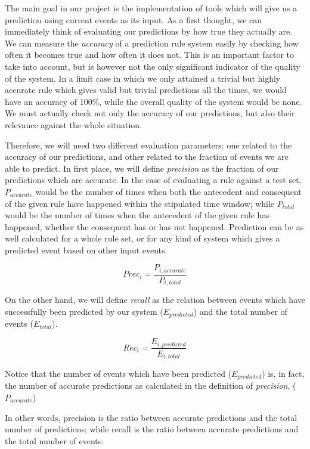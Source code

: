 \documentclass[a4paper,12pt]{article}
\begin{document}
The main goal in our project is the implementation of tools which will give us a prediction using current events as its input. As a first thought, we can immediately think of evaluating our predictions by how true they actually are. We can measure the \emph{accuracy} of a prediction rule system easily by checking how often it becomes true and how often it does not. This is an important factor to take into account, but is however not the only significant indicator of the quality of the system. In a limit case in which we only attained a trivial but highly accurate rule which gives valid but trivial predictions all the times, we would have an accuracy of 100\%, while the overall quality of the system would be none. We must actually check not only the accuracy of our predictions, but also their relevance against the whole situation.

Therefore, we will need two different evaluation parameters: one related to the accuracy of our predictions, and other related to the fraction of events we are able to predict\cite{torgo2003data}. In first place, we will define \emph{precision} as the fraction of our predictions which are accurate. In the case of evaluating a rule against a test set, $P_{accurate}$ would be the number of times when both the antecedent and consequent of the given rule have happened within the stipulated time window; while $P_{total}$ would be the number of times when the antecedent of the given rule has happened, whether the consequent has or has not happened. Prediction can be as well calculated for a whole rule set, or for any kind of system which gives a predicted event based on other input events.

\begin{equation}
Prec_i = \dfrac{ P_{i, accurate}}{ P_{i, total} }
\end{equation}

On the other hand, we will define \emph{recall} as the relation between events which have successfully been predicted by our system ($E_{predicted}$) and the total number of events ($E_{total}$). 

\begin{equation}
Rec_i = \dfrac{ E_{i, predicted}}{ E_{i, total} }
\end{equation}

Notice that the number of events which have been predicted ($E_{predicted}$) is, in fact, the number of accurate predictions as calculated in the definition of \emph{precision}, ($P_{accurate}$)

In other words, precision is the ratio between accurate predictions and the total number of predictions; while recall is the ratio between accurate predictions and the total number of events.
\end{document}
